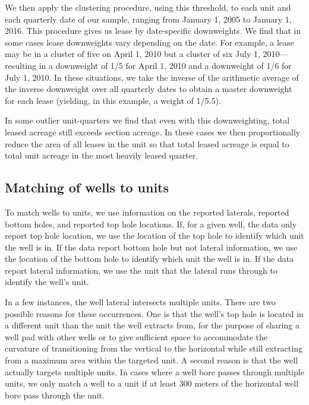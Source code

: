\documentclass[12pt]{article}
\begin{document}
We then apply the clustering procedure, using this threshold, to each unit and each quarterly date of our sample, ranging from January 1, 2005 to January 1, 2016. This procedure gives us lease by date-specific downweights. We find that in some cases lease downweights vary depending on the date. For example, a lease may be in a cluster of five on April 1, 2010 but a cluster of six July 1, 2010---resulting in a downweight of 1/5 for April 1, 2010 and a downweight of 1/6 for July 1, 2010. In these situations, we take the inverse of the arithmetic average of the inverse downweight over all quarterly dates to obtain a master downweight for each lease (yielding, in this example, a weight of 1/5.5).

In some outlier unit-quarters we find that even with this downweighting, total leased acreage still exceeds section acreage. In these cases we then proportionally reduce the area of all leases in the unit so that total leased acreage is equal to total unit acreage in the most heavily leased quarter.


\subsection{Matching of wells to units} \label{appx:wellunitmatch}

To match wells to units, we use information on the reported laterals, reported bottom holes, and reported top hole locations. If, for a given well, the data only report top hole location, we use the location of the top hole to identify which unit the well is in. If the data report bottom hole but not lateral information, we use the location of the bottom hole to identify which unit the well is in. If the data report lateral information, we use the unit that the lateral runs through to identify the well's unit.

In a few instances, the well lateral intersects multiple units. There are two possible reasons for these occurrences. One is that the well's top hole is located in a different unit than the unit the well extracts from, for the purpose of sharing a well pad with other wells or to give sufficient space to accommodate the curvature of transitioning from the vertical to the horizontal while still extracting from a maximum area within the targeted unit. A second reason is that the well actually targets multiple units. In cases where a well bore passes through multiple units, we only match a well to a unit if at least 300 meters of the horizontal well bore pass through the unit.
\end{document}
